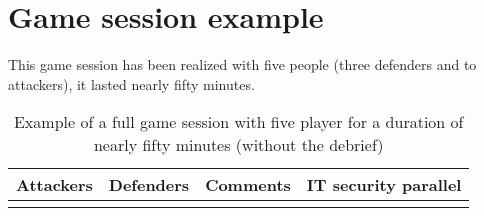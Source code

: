 \documentclass[11pt]{article} %
\begin{document}
\section{Game session example}
This game session has been realized with five people (three defenders and to attackers), 
it lasted nearly fifty minutes.

\begin{longtable}{|p{3cm}|p{3cm}|p{3cm}|p{3cm}|}
    

  \caption[Real case]{Example of a full game session with five player for a duration of 
  nearly fifty minutes (without the debrief)}  \\
      
\hline 
Attackers & Defenders & Comments & IT security parallel \\
\hline 
\endhead 
\hline 
\endfoot


\end{longtable}
\end{document}
